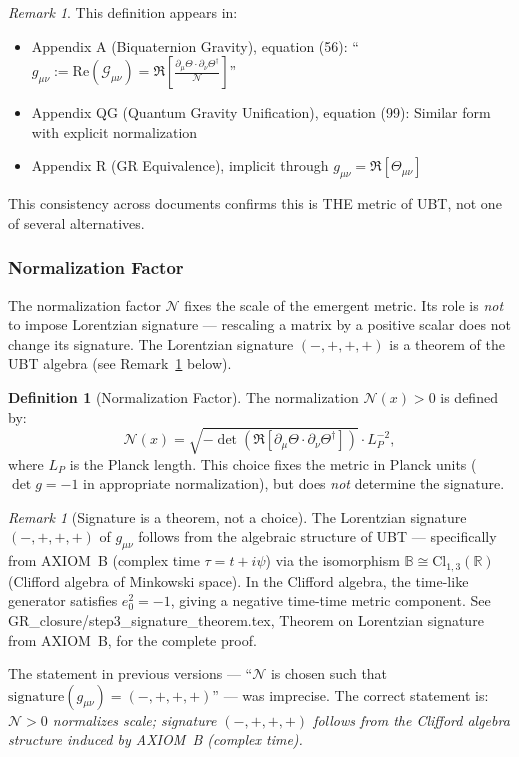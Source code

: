 \documentclass[12pt]{article}
\theoremstyle{definition}
\newtheorem{definition}[theorem]{Definition}
\theoremstyle{remark}
\newtheorem{remark}[theorem]{Remark}
\begin{document}
\begin{remark}
This definition appears in:
\begin{itemize}
    \item Appendix A (Biquaternion Gravity), equation (56): ``$g_{\mu\nu} := \text{Re}(\mathcal{G}_{\mu\nu}) = \Re\left[ \frac{\partial_\mu \Theta \cdot \partial_\nu \Theta^\dagger}{\mathcal{N}} \right]$''
    \item Appendix QG (Quantum Gravity Unification), equation (99): Similar form with explicit normalization
    \item Appendix R (GR Equivalence), implicit through $g_{\mu\nu} = \Re[\Theta_{\mu\nu}]$
\end{itemize}
This consistency across documents confirms this is THE metric of UBT, not one of several alternatives.
\end{remark}

\subsubsection{Normalization Factor}

The normalization factor $\mathcal{N}$ fixes the scale of the emergent metric.
Its role is \emph{not} to impose Lorentzian signature — rescaling a matrix by a
positive scalar does not change its signature.  The Lorentzian signature $(-,+,+,+)$
is a theorem of the UBT algebra (see Remark~\ref{rem:signature_theorem_reference} below).

\begin{definition}[Normalization Factor]
The normalization $\mathcal{N}(x) > 0$ is defined by:
\begin{equation}
\mathcal{N}(x) = \sqrt{-\det\left(\Re\left[\partial_\mu \Theta \cdot \partial_\nu \Theta^\dagger\right]\right)} \cdot L_P^{-2},
\end{equation}
where $L_P$ is the Planck length.  This choice fixes the metric in Planck units
($\det g = -1$ in appropriate normalization), but does \emph{not} determine the signature.
\end{definition}

\begin{remark}[Signature is a theorem, not a choice]
\label{rem:signature_theorem_reference}
The Lorentzian signature $(-,+,+,+)$ of $g_{\mu\nu}$ follows from the algebraic
structure of UBT — specifically from AXIOM~B (complex time $\tau = t + i\psi$)
via the isomorphism $\mathbb{B}\cong\mathrm{Cl}_{1,3}(\mathbb{R})$
(Clifford algebra of Minkowski space).  In the Clifford algebra, the time-like
generator satisfies $e_0^2 = -1$, giving a negative time-time metric component.
See GR\_closure/step3\_signature\_theorem.tex, Theorem on Lorentzian signature
from AXIOM~B, for the complete proof.

The statement in previous versions — ``$\mathcal{N}$ is chosen such that
$\mathrm{signature}(g_{\mu\nu}) = (-,+,+,+)$'' — was imprecise.
The correct statement is: \emph{$\mathcal{N} > 0$ normalizes scale;
signature $(-,+,+,+)$ follows from the Clifford algebra structure induced by
AXIOM~B (complex time).}
\end{remark}
\end{document}
